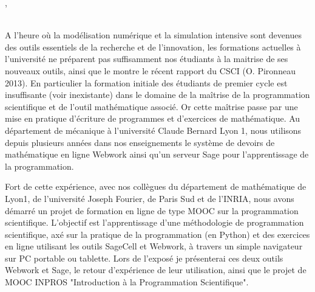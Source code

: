 \documentclass[10pt]{article}
\def\orateur#1#2{\begin{center}{\underline{\large{\bf #1}}}, {#2}\end{center}}
\def\auteur#1#2{\begin{center}{\large{\bf #1}}, {#2}\end{center}}
\def\motscles#1{%
	\ifx#1\IsUndefined\relax\else\noindent{\normalsize{\bf Mots-cl\'es :}} #1\\ \fi}
\begin{document}
\orateur{\NomOrateur}{\AdresseCourteOrateur}
%
\motscles{\listmotcles}
A l'heure o\`u la mod\'elisation num\'erique et la simulation intensive sont
devenues des outils essentiels de la recherche et de l'innovation, les formations
actuelles  \`a l'universit\'e ne pr\'eparent pas suffisamment nos \'etudiants \`a la maitrise de
ses nouveaux outils, ainsi que le montre le r\'ecent rapport du CSCI (O. Pironneau 2013).
En particulier la formation initiale des \'etudiants de premier cycle est insuffisante
(voir inexistante) dans le domaine de la ma\^itrise de la programmation scientifique et
de l'outil math\'ematique associ\'e. Or cette ma\^itrise passe par une mise en pratique
d'\'ecriture de programmes et d'exercices de math\'ematique. Au d\'epartement de m\'ecanique \`a
l'universit\'e Claude Bernard Lyon 1, nous utilisons depuis plusieurs ann\'ees dans nos enseignements
le syst\`eme de devoirs de math\'ematique en ligne Webwork \cite{webwork}
ainsi qu'un serveur Sage \cite{sage} pour l'apprentissage de la programmation.

Fort de cette exp\'erience, avec nos coll\`egues du d\'epartement de math\'ematique de Lyon1, de l'universit\'e Joseph Fourier, de Paris Sud
et de l'INRIA, nous avons d\'emarr\'e un projet de formation en ligne de type MOOC sur la programmation scientifique.
L'objectif est l'apprentissage d'une m\'ethodologie de programmation scientifique, ax\'e sur
la pratique de la programmation (en Python) et des exercices en ligne utilisant les outils SageCell et Webwork,
\`a travers un simple navigateur sur PC portable ou tablette.
Lors de l'expos\'e je pr\'esenterai ces deux outils Webwork et Sage, le retour d'exp\'erience de leur utilisation,
ainsi que le projet de MOOC INPROS \cite{inpros} "Introduction à la Programmation Scientifique".
\end{document}
